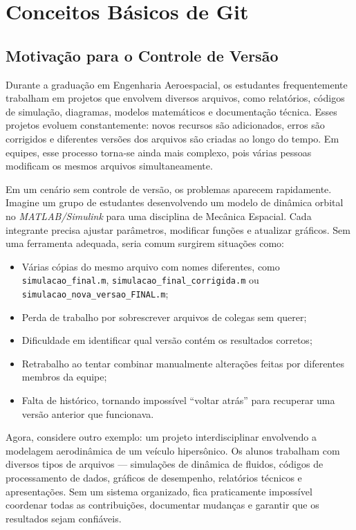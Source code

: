 \newpage
\section{Conceitos Básicos de Git}
\subsection{Motivação para o Controle de Versão}

Durante a graduação em Engenharia Aeroespacial, os estudantes frequentemente trabalham em projetos que envolvem diversos arquivos, como relatórios, códigos de simulação, diagramas, modelos matemáticos e documentação técnica. Esses projetos evoluem constantemente: novos recursos são adicionados, erros são corrigidos e diferentes versões dos arquivos são criadas ao longo do tempo. Em equipes, esse processo torna-se ainda mais complexo, pois várias pessoas modificam os mesmos arquivos simultaneamente.

Em um cenário sem controle de versão, os problemas aparecem rapidamente. Imagine um grupo de estudantes desenvolvendo um modelo de dinâmica orbital no \textit{MATLAB/Simulink} para uma disciplina de Mecânica Espacial. Cada integrante precisa ajustar parâmetros, modificar funções e atualizar gráficos. Sem uma ferramenta adequada, seria comum surgirem situações como:

\begin{itemize}
    \item Várias cópias do mesmo arquivo com nomes diferentes, como \texttt{simulacao\_final.m}, \texttt{simulacao\_final\_corrigida.m} ou \texttt{simulacao\_nova\_versao\_FINAL.m};
    \item Perda de trabalho por sobrescrever arquivos de colegas sem querer;
    \item Dificuldade em identificar qual versão contém os resultados corretos;
    \item Retrabalho ao tentar combinar manualmente alterações feitas por diferentes membros da equipe;
    \item Falta de histórico, tornando impossível “voltar atrás” para recuperar uma versão anterior que funcionava.
\end{itemize}

Agora, considere outro exemplo: um projeto interdisciplinar envolvendo a modelagem aerodinâmica de um veículo hipersônico. Os alunos trabalham com diversos tipos de arquivos — simulações de dinâmica de fluidos, códigos de processamento de dados, gráficos de desempenho, relatórios técnicos e apresentações. Sem um sistema organizado, fica praticamente impossível coordenar todas as contribuições, documentar mudanças e garantir que os resultados sejam confiáveis.

